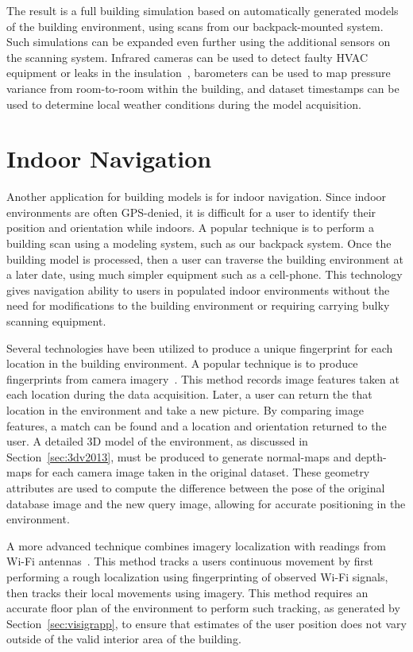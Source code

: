 \documentclass[12pt,onecolumn,oneside]{book}
\begin{document}
The result is a full building simulation based on automatically generated models of the building environment, using scans from our backpack-mounted system.  Such simulations can be expanded even further using the additional sensors on the scanning system.  Infrared cameras can be used to detect faulty HVAC equipment or leaks in the insulation~\cite{Oreifej14}, barometers can be used to map pressure variance from room-to-room within the building, and dataset timestamps can be used to determine local weather conditions during the model acquisition.

\section{Indoor Navigation}
\label{sec:application_indoornav}

Another application for building models is for indoor navigation.  Since indoor environments are often GPS-denied, it is difficult for a user to identify their position and orientation while indoors.  A popular technique is to perform a building scan using a modeling system, such as our backpack system.  Once the building model is processed, then a user can traverse the building environment at a later date, using much simpler equipment such as a cell-phone.  This technology gives navigation ability to users in populated indoor environments without the need for modifications to the building environment or requiring carrying bulky scanning equipment. 

Several technologies have been utilized to produce a unique fingerprint for each location in the building environment.  A popular technique is to produce fingerprints from camera imagery~\cite{Liang13}.  This method records image features taken at each location during the data acquisition.  Later, a user can return the that location in the environment and take a new picture.  By comparing image features, a match can be found and a location and orientation returned to the user.  A detailed 3D model of the environment, as discussed in Section~\ref{sec:3dv2013}, must be produced to generate normal-maps and depth-maps for each camera image taken in the original dataset.  These geometry attributes are used to compute the difference between the pose of the original database image and the new query image, allowing for accurate positioning in the environment.

A more advanced technique combines imagery localization with readings from Wi-Fi antennas~\cite{Levchev14}.  This method tracks a users continuous movement by first performing a rough localization using fingerprinting of observed Wi-Fi signals, then tracks their local movements using imagery.  This method requires an accurate floor plan of the environment to perform such tracking, as generated by Section~\ref{sec:visigrapp}, to ensure that estimates of the user position does not vary outside of the valid interior area of the building.
\end{document}
